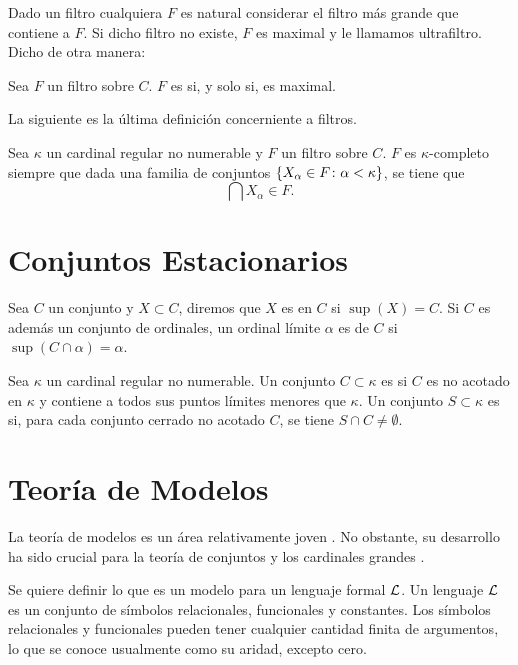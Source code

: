 Dado un filtro cualquiera $F$ es natural considerar el filtro más grande
que contiene a $F$. Si dicho filtro no existe, $F$ es maximal y le llamamos ultrafiltro.
Dicho de otra manera:

\begin{defi}
    Sea $F$ un filtro sobre $C$. $F$ es  si, y solo si, es maximal.
\end{defi}

La siguiente es la última definición concerniente a filtros.

\begin{defi}
    Sea $\kappa$ un cardinal regular no numerable y $F$ un filtro sobre $C$.
    $F$ es $\kappa$-completo siempre que dada una familia de conjuntos
    $\left\{ X_\alpha\in F\colon \alpha<\kappa \right\}$,
    se tiene que
    \[
        \bigcap X_\alpha \in F.
    \]
\end{defi}

\section{Conjuntos Estacionarios}

Sea $C$ un conjunto y $X\subset C$, diremos que $X$ es 
en $C$ si $\sup(X) = C$.
Si $C$ es además un conjunto de ordinales, un ordinal límite $\alpha$ es
 de $C$ si $\sup ( C \cap\alpha ) = \alpha$.
\begin{defi}
    Sea $\kappa$ un cardinal regular no numerable. Un conjunto $C\subset \kappa$
    es  si $C$ es no acotado en $\kappa$ y contiene a
    todos sus puntos límites menores que $\kappa$.
    Un conjunto $S\subset\kappa$ es  si, para cada conjunto
    cerrado no acotado $C$, se tiene $S\cap C\neq\emptyset$.
\end{defi}

\section{Teoría de Modelos}
\label{sec:models}

La teoría de modelos es un área relativamente joven \autocite[pág. 3]{chang_model_2012}.
No obstante, su desarrollo ha sido crucial para la teoría de conjuntos y los
cardinales grandes \autocite[pág. xv]{kanamori_higher_2009}.

Se quiere definir lo que es un modelo para un lenguaje formal $\mathcal { L }$.
Un lenguaje $\mathcal { L }$ es un conjunto de símbolos relacionales, funcionales y constantes.
Los símbolos relacionales y funcionales pueden tener cualquier cantidad finita de argumentos,
lo que se conoce usualmente como su aridad, excepto cero.

